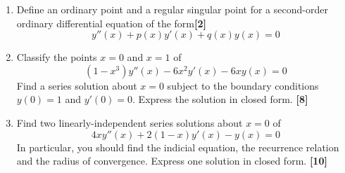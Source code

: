 \documentclass[a4paper]{article}
\begin{document}
\newpage
\begin{qns}\leavevmode
\begin{enumerate}[label=(\alph*)]
\item Define an ordinary point and a regular singular point for a second-order ordinary differential equation of the form\hfill\textbf{[2]}
$$y''(x)+p(x)y'(x)+q(x)y(x)=0$$
\item Classify the points $x = 0$ and $x = 1$ of
$$(1 − x^3)y''(x) − 6x^2y'(x) − 6xy(x) = 0$$
Find a series solution about $x = 0$ subject to the boundary conditions $y(0) = 1$ and $y'(0) = 0$. Express the solution in closed form. \hfill\textbf{[8]}
\item Find two linearly-independent series solutions about $x = 0$ of
$$4xy''(x)+2(1-x)y'(x)-y(x)=0$$
In particular, you should find the indicial equation, the recurrence relation and the radius of convergence. Express one solution in closed form. \hfill\textbf{[10]}
\end{enumerate}
\end{qns}
\end{document}

